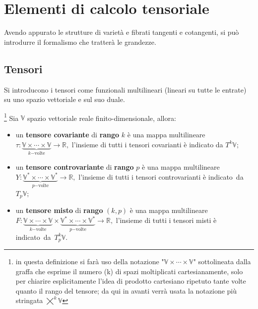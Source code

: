 \chapter{Elementi di calcolo tensoriale}
Avendo appurato le strutture di varietà e fibrati tangenti e cotangenti, si può introdurre il formalismo che tratterà le grandezze.
\section{Tensori}
Si introducono i tensori come funzionali multilineari (lineari su tutte le entrate) su uno spazio vettoriale e sul suo duale.
\begin{definition}
    \footnote{
        in questa definizione si farà uso della notazione "$\mathbb{V} \times \cdots \times \mathbb{V}$" sottolineata dalla graffa che esprime il numero (k) di spazi moltiplicati cartesianamente, solo per chiarire esplicitamente l'idea di prodotto cartesiano ripetuto tante volte quanto il rango del tensore; da qui in avanti verrà usata la notazione più stringata $\bigtimes^k \mathbb{V}$
    }
    Sia $\mathbb{V}$ spazio vettoriale reale finito-dimensionale, allora:
    \begin{itemize}
        \item un \textbf{tensore covariante} di \textbf{rango} $k$ è una mappa multilineare \\
              $\tau : \underbrace{\mathbb{V} \times \cdots \times \mathbb{V}}_{k \mathrm{-volte}} \longrightarrow \mathbb{R},$ l'insieme di tutti i tensori covarianti è indicato da $T^k\mathbb{V};$
        \item un \textbf{tensore controvariante} di \textbf{rango} $p$ è una mappa multilineare \\
              $Y : \underbrace{\mathbb{V^*} \times \cdots \times \mathbb{V^*}}_{p \mathrm{-volte}} \longrightarrow \mathbb{R},$ l'insieme di tutti i tensori controvarianti è \mbox{indicato da $T_p\mathbb{V};$}
        \item un \textbf{tensore misto} di \textbf{rango} $(k, p)$ è una mappa multilineare \\
              $ F : \underbrace{\mathbb{V} \times \cdots \times \mathbb{V}}_{k \mathrm{-volte}} \times \underbrace{\mathbb{V^*} \times \cdots \times \mathbb{V^*}}_{p \mathrm{-volte}} \longrightarrow \mathbb{R},$ l'insieme di tutti i tensori misti è \mbox{indicato da $T^k_p\mathbb{V}$.}
    \end{itemize}
\end{definition}

